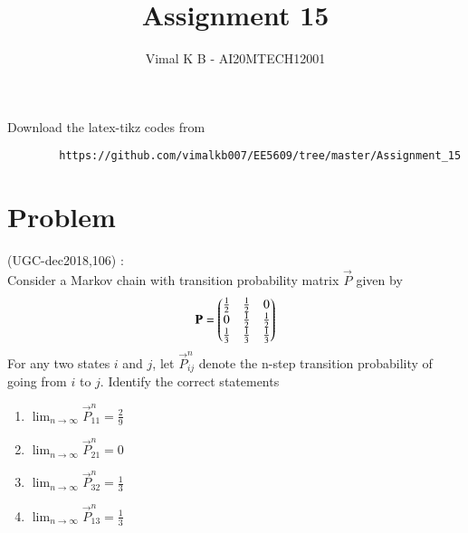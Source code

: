 \documentclass[journal,12pt]{IEEEtran}
\begin{document}
	\renewcommand{\thefigure}{\theproblem}
	\def\putbox#1#2#3{\makebox[0in][l]{\makebox[#1][l]{}\raisebox{\baselineskip}[0in][0in]{\raisebox{#2}[0in][0in]{#3}}}}
	\def\rightbox#1{\makebox[0in][r]{#1}}
	\def\centbox#1{\makebox[0in]{#1}}
	\def\topbox#1{\raisebox{-\baselineskip}[0in][0in]{#1}}
	\def\midbox#1{\raisebox{-0.5\baselineskip}[0in][0in]{#1}}
	\vspace{3cm}
	\title{Assignment 15}
	\author{Vimal K B - AI20MTECH12001}
	\maketitle
	\bigskip
	\renewcommand{\thefigure}{\theenumi}
	\renewcommand{\thetable}{\theenumi}
	Download the latex-tikz codes from 
	\begin{lstlisting}
		https://github.com/vimalkb007/EE5609/tree/master/Assignment_15
	\end{lstlisting}
	\section{\textbf{Problem}}
	(UGC-dec2018,106) : \\
	Consider a Markov chain with transition probability matrix $\vec{P}$ given by
	\begin{align}
		\mathbf{P}=\begin{pmatrix}\frac{1}{2} & \frac{1}{2} & 0 \\
			0 & \frac{1}{2} & \frac{1}{2} \\
			\frac{1}{3} & \frac{1}{3} & \frac{1}{3}\end{pmatrix} \nonumber
	\end{align}
	For any two states $i$ and $j$, let $\vec{P}^{n}_{ij}$ denote the n-step transition probability of going from $i$ to $j$. Identify the correct statements
	\begin{enumerate}
		\item $\lim_{n \to \infty} \vec{P}^{n}_{11} = \frac{2}{9}$
		\item $\lim_{n \to \infty} \vec{P}^{n}_{21} = 0$
		\item $\lim_{n \to \infty} \vec{P}^{n}_{32} = \frac{1}{3}$
		\item $\lim_{n \to \infty} \vec{P}^{n}_{13} = \frac{1}{3}$
	\end{enumerate}
	
\end{document}

